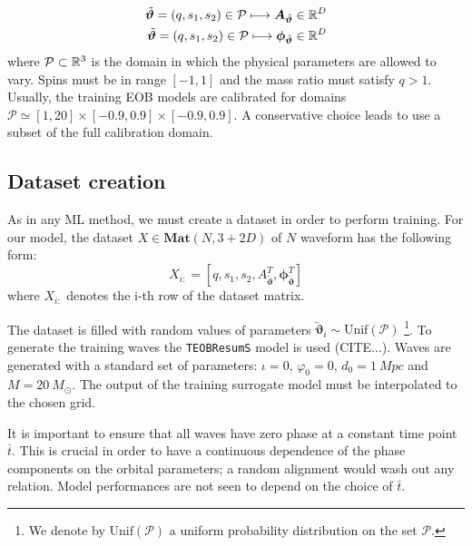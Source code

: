 \begin{align}
	{\tilde{\boldsymbol{\vartheta}}} = (q, s_1, s_2) \in \mathcal{P} \longmapsto \boldsymbol{A}_{{\tilde{\boldsymbol{\vartheta}}}} \in \mathbb{R}^D \\
	{\tilde{\boldsymbol{\vartheta}}} = (q, s_1, s_2) \in \mathcal{P} \longmapsto \boldsymbol{\phi}_{{\tilde{\boldsymbol{\vartheta}}}} \in \mathbb{R}^D 
\end{align}
where $\mathcal{P} \subset \mathbb{R}^3$ is the domain in which the physical parameters are allowed to vary.
Spins must be in range $[-1,1]$ and the mass ratio must satisfy $q>1$.
Usually, the training EOB models are calibrated for domains $\mathcal{P} \simeq [1,20]\times[-0.9,0.9]\times[-0.9,0.9]$. A conservative choice leads to use a subset of the full calibration domain.

\subsection{Dataset creation}
As in any ML method, we must create a dataset in order to perform training.
For our model, the dataset ${X \in \mathbf{Mat}(N,3+2D)}$ of $N$ waveform has the following form:
\begin{equation} \label{eq:dataset}
	X_{i:} = [q,s_1,s_2, {A}_{{\tilde{\boldsymbol{\vartheta}}}}^T, \boldsymbol{\phi}_{{\tilde{\boldsymbol{\vartheta}}}}^T]
\end{equation}
where $X_{i:}$ denotes the i-th row of the dataset matrix.
\par
The dataset is filled with random values of parameters ${\tilde{\boldsymbol{\vartheta}}}_i \sim \textrm{Unif}(\mathcal{P})$
\footnote{We denote by $\textrm{Unif}(\mathcal{P})$ a uniform probability distribution on the set $\mathcal{P}$.}.
To generate the training waves the \texttt{TEOBResumS} model is used (CITE...).
Waves are generated with a standard set of parameters: $\iota =0 $, $\varphi_0 = 0$, $d_0 = \SI{1}{Mpc}$ and $M = \SI{20}{M_\odot}$.
The output of the training surrogate model must be interpolated to the chosen grid.
\par
It is important to ensure that all waves have zero phase at a constant time point $\bar{t}$. This is crucial in order to have a continuous dependence of the phase components on the orbital parameters; a random alignment would wash out any relation. Model performances are not seen to depend on the choice of $\bar{t}$.
